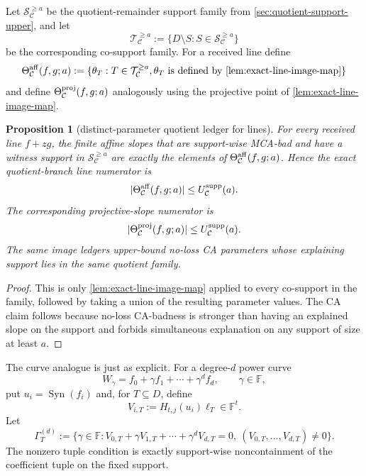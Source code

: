 \documentclass[11pt]{article}
\newtheorem{proposition}[proposition]{Proposition}
\theoremstyle{definition}
\theoremstyle{remark}
\newcommand{\F}{\mathbb{F}}
\newcommand{\Syn}{\operatorname{Syn}}
\begin{document}
Let $\mathcal S_{\mathcal C}^{\ge a}$ be the quotient-remainder support family
from \cref{sec:quotient-support-upper}, and let
\[
        \mathcal T_{\mathcal C}^{\ge a}
        :=\{D\setminus S:S\in\mathcal S_{\mathcal C}^{\ge a}\}
\]
be the corresponding co-support family.  For a received line define
\[
        \Theta_{\mathcal C}^{\rm aff}(f,g;a)
        :=\{\theta_T:T\in\mathcal T_{\mathcal C}^{\ge a},
              \theta_T\text{ is defined by }\cref{lem:exact-line-image-map}\}
\]
and define $\Theta_{\mathcal C}^{\rm proj}(f,g;a)$ analogously using the
projective point of \cref{lem:exact-line-image-map}.

\begin{proposition}[distinct-parameter quotient ledger for lines]
\label{prop:distinct-parameter-line-ledger}
For every received line $f+zg$, the finite affine slopes that are support-wise
MCA-bad and have a witness support in
$\mathcal S_{\mathcal C}^{\ge a}$ are exactly the elements of
$\Theta_{\mathcal C}^{\rm aff}(f,g;a)$.  Hence the exact quotient-branch line
numerator is
\[
        |\Theta_{\mathcal C}^{\rm aff}(f,g;a)|
        \le U_{\mathcal C}^{\rm supp}(a).
\]
The corresponding projective-slope numerator is
\[
        |\Theta_{\mathcal C}^{\rm proj}(f,g;a)|
        \le U_{\mathcal C}^{\rm supp}(a).
\]
The same image ledgers upper-bound no-loss CA parameters whose explaining
support lies in the same quotient family.
\end{proposition}

\begin{proof}
This is only \cref{lem:exact-line-image-map} applied to every co-support in the
family, followed by taking a union of the resulting parameter values.  The CA
claim follows because no-loss CA-badness is stronger than having an explained
slope on the support and forbids simultaneous explanation on any support of size
at least $a$.
\end{proof}

The curve analogue is just as explicit.  For a degree-$d$ power curve
\[
        W_\gamma=f_0+\gamma f_1+\cdots+\gamma^d f_d,
        \qquad \gamma\in\F,
\]
put $u_i=\Syn(f_i)$ and, for $T\subseteq D$, define
\[
        V_{i,T}:=H_{t,j}(u_i)\boldsymbol\ell_T\in\F^t .
\]
Let
\[
        \Gamma_T^{(d)}
        :=\{\gamma\in\F:
             V_{0,T}+\gamma V_{1,T}+\cdots+\gamma^dV_{d,T}=0,
             \ (V_{0,T},\ldots,V_{d,T})\ne0\} .
\]
The nonzero tuple condition is exactly support-wise noncontainment of the
coefficient tuple on the fixed support.
\end{document}
